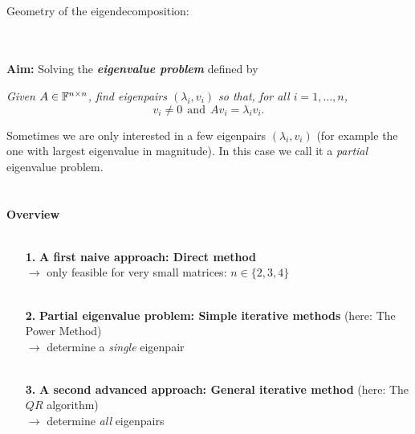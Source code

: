 \begin{frame}
~\\
Geometry of the eigendecomposition:~\\~\\
\end{frame}




 


\begin{frame}
~\\
\textbf{Aim:} Solving the \textit{\textbf{eigenvalue problem}} defined by
\begin{center}
	\textit{Given $A \in {\mathbb{F}}^{n\times n}$, find eigenpairs $(\lambda_i, v_i)$ so that, for all $i=1,\ldots,n$,
		$$v_i \neq 0 ~~\text{and}~~Av_i = \lambda_i v_i .$$}  
\end{center}
Sometimes we are only interested in a few eigenpairs $(\lambda_i, v_i)$ (for example the one with largest eigenvalue in magnitude). In this case we call it a \textit{partial} eigenvalue problem.
~\\~\\~\\
\textbf{Overview}\\~\\
\begin{itemize}
	\item[\bfseries 1.]\textbf{A first naive approach: Direct method}\\
	$\rightarrow$ only feasible for very small matrices: $n\in\{2,3,4\}$ \\~\\
	\item[\bfseries 2.]\textbf{Partial eigenvalue problem: Simple iterative methods} (here: The Power Method)\\
	$\rightarrow$ determine a \textit{single} eigenpair	\\~\\
	\item[\bfseries 3.] \textbf{A second advanced approach: General iterative method} (here: The $QR$ algorithm)  \\
	$\rightarrow$ determine \textit{all} eigenpairs
\end{itemize}
\end{frame}






